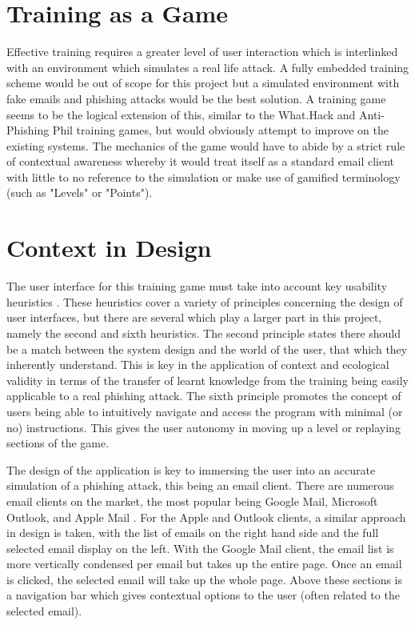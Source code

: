 \documentclass{l4proj}
\begin{document}
\section{Training as a Game}
Effective training requires a greater level of user interaction which is interlinked with an environment which simulates a real life attack. A fully embedded training scheme would be out of scope for this project but a simulated environment with fake emails and phishing attacks would be the best solution. A training game seems to be the logical extension of this, similar to the What.Hack and Anti-Phishing Phil training games, but would obviously attempt to improve on the existing systems. The mechanics of the game would have to abide by a strict rule of contextual awareness whereby it would treat itself as a standard email client with little to no reference to the simulation or make use of gamified terminology (such as "Levels" or "Points").

\section{Context in Design}
The user interface for this training game must take into account key usability heuristics \citep{nielsen2005ten}. These heuristics cover a variety of principles concerning the design of user interfaces, but there are several which play a larger part in this project, namely the second and sixth heuristics. The second principle states there should be a match between the system design and the world of the user, that which they inherently understand. This is key in the application of context and ecological validity in terms of the transfer of learnt knowledge from the training being easily applicable to a real phishing attack. The sixth principle promotes the concept of users being able to intuitively navigate and access the program with minimal (or no) instructions. This gives the user autonomy in moving up a level or replaying sections of the game.

The design of the application is key to immersing the user into an accurate simulation of a phishing attack, this being an email client. There are numerous email clients on the market, the most popular being Google Mail, Microsoft Outlook, and Apple Mail \citep{emailclientlitmus}. For the Apple and Outlook clients, a similar approach in design is taken, with the list of emails on the right hand side and the full selected email display on the left. With the Google Mail client, the email list is more vertically condensed per email but takes up the entire page. Once an email is clicked, the selected email will take up the whole page. Above these sections is a navigation bar which gives contextual options to the user (often related to the selected email). 
\end{document}
